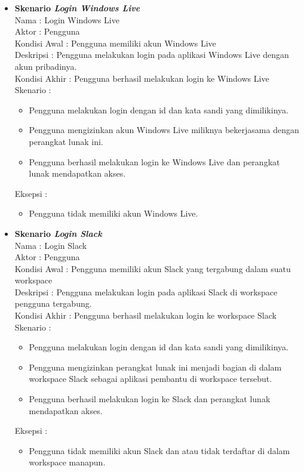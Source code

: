 \begin{itemize}
    \item \textbf{Skenario \textit{Login Windows Live}}\\
    Nama : Login Windows Live\\
    Aktor : Pengguna\\
    Kondisi Awal : Pengguna memiliki akun Windows Live\\
    Deskripsi : Pengguna melakukan login pada aplikasi Windows Live dengan akun pribadinya.\\
    Kondisi Akhir : Pengguna berhasil melakukan login ke Windows Live\\
    Skenario : 
    \begin{itemize}
        \item Pengguna melakukan login dengan id dan kata sandi yang dimilikinya. 
        \item Pengguna mengizinkan akun Windows Live miliknya bekerjasama dengan perangkat lunak ini. 
        \item Pengguna berhasil melakukan login ke Windows Live dan perangkat lunak mendapatkan akses. 
    \end{itemize}
    Eksepsi : 
    \begin{itemize}
        \item Pengguna tidak memiliki akun Windows Live. 
    \end{itemize}
    
    \item \textbf{Skenario \textit{Login Slack}}\\
    Nama : Login Slack\\
    Aktor : Pengguna\\
    Kondisi Awal : Pengguna memiliki akun Slack yang tergabung dalam suatu workspace\\
    Deskripsi : Pengguna melakukan login pada aplikasi Slack di workspace pengguna tergabung.\\
    Kondisi Akhir : Pengguna berhasil melakukan login ke workspace Slack\\
    Skenario : 
    \begin{itemize}
        \item Pengguna melakukan login dengan id dan kata sandi yang dimilikinya. 
        \item Pengguna mengizinkan perangkat lunak ini menjadi bagian di dalam workspace Slack sebagai aplikasi pembantu di workspace tersebut. 
        \item Pengguna berhasil melakukan login ke Slack dan perangkat lunak mendapatkan akses. 
    \end{itemize}
    Eksepsi : 
    \begin{itemize}
        \item Pengguna tidak memiliki akun Slack dan atau tidak terdaftar di dalam workspace manapun. 
    \end{itemize}
    

\end{itemize}
